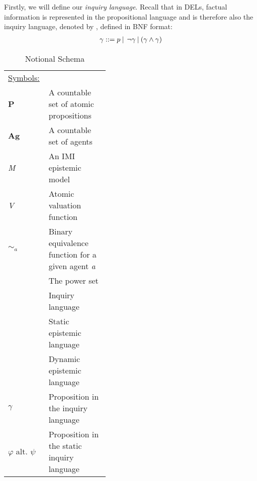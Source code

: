 Firstly, we will define our \textit{inquiry language}. Recall that in
DELs, factual information is represented in the propositional language
and is therefore also the inquiry language, denoted by \oracle, defined in BNF
format:
\begin{align}
    \gamma::= p \:|\:\:\neg\gamma\:|\:(\gamma\land\gamma) \label{eq:1}
\end{align}
\begin{table}[t]
	\caption{Notional Schema \label{notationalschema}}
	\begin{tabularx}{\linewidth}{p{0.40\linewidth}X}
		\toprule
		
		\multicolumn{2}{l}{{\underline{Symbols:}}}                                                             \\
		\textbf{P}                                  & A countable set of atomic propositions                   \\
		\textbf{Ag}                                 & A countable set of agents                                \\
		\textit{M}                                  & An IMI epistemic model                                   \\
		\textit{V}                                  & Atomic valuation function                                \\
		$\sim_a$                                    & Binary equivalence function for a given agent \textit{a} \\
		\textbf{\powset}                            & The power set                                            \\
		\oracle                                     & Inquiry language                                         \\
		\staticlang                                 & Static epistemic language                                \\
		\dynlang                                    & Dynamic epistemic language                               \\
		$\gamma$                                    & Proposition in the inquiry language                      \\
		$\varphi$ alt. $\psi$                       & Proposition in the static inquiry language               \\
		

\end{tabularx}
\end{table}
